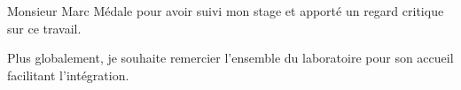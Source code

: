 \documentclass[a4paper,11pt]{report}    %
\begin{document}
Monsieur Marc Médale pour avoir suivi mon stage et apporté un regard critique sur ce travail.

Plus globalement, je souhaite remercier l'ensemble du laboratoire pour son accueil facilitant l'intégration.

\setcounter{page}{1}









\newpage
\printbibliography
\appendix
%
%
%
\end{document}
